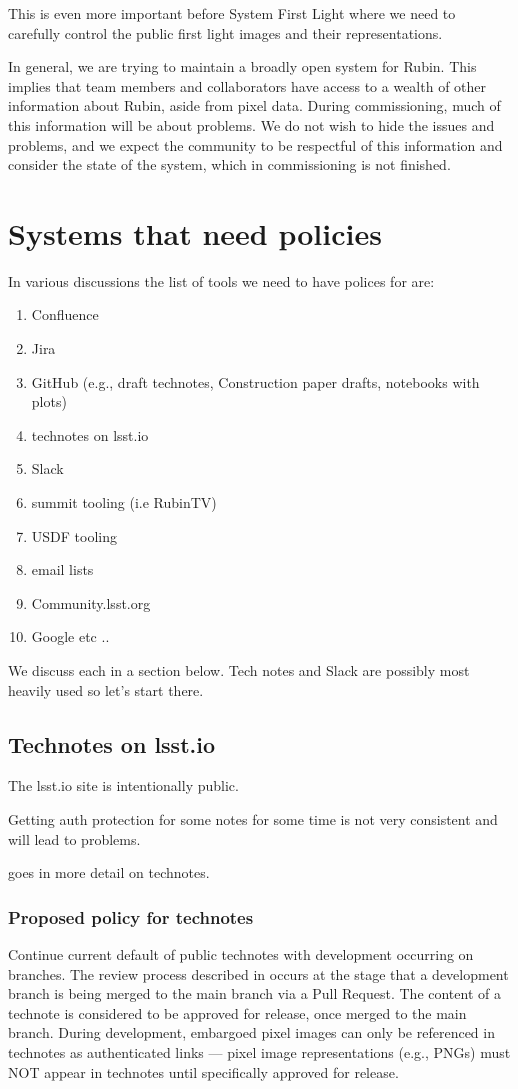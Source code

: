 This is even more important before System First Light where we need to carefully control the public first light images and their representations.

In general, we are trying to maintain a broadly open system for Rubin.
This implies that team members and collaborators have access to a wealth of other information about Rubin, aside from pixel data.
During commissioning, much of this information will be about problems.
We do not wish to hide the issues and problems, and we expect the community to be respectful of this information and consider the state of the system, which in commissioning is not finished.

\section {Systems that need policies}
In various discussions the list of tools we need to have polices for are:

\begin{enumerate}
    \item Confluence
    \item Jira
    \item GitHub (e.g., draft technotes, Construction paper drafts, notebooks with plots)
    \item technotes on lsst.io
    \item Slack
    \item summit tooling (i.e RubinTV)
    \item USDF tooling
    \item email lists
    \item Community.lsst.org
    \item Google etc ..
\end{enumerate}

We discuss each in a section below.
Tech notes and Slack are possibly most heavily used so let's start there.



\subsection{Technotes on lsst.io}
The lsst.io site is intentionally public.

Getting auth protection for some notes for some time is not very consistent and will lead to problems.

 goes in more detail on technotes.

\subsubsection{Proposed policy for technotes}
Continue current default of public technotes with development occurring on branches. The review process described in  occurs at the stage that a development branch is being merged to the main branch via a Pull Request. The content of a technote is considered to be approved for release, once merged to the main branch.
During development, embargoed pixel images can only be referenced in technotes as authenticated links --- pixel image representations (e.g., PNGs) must NOT appear in technotes until specifically approved for release.

